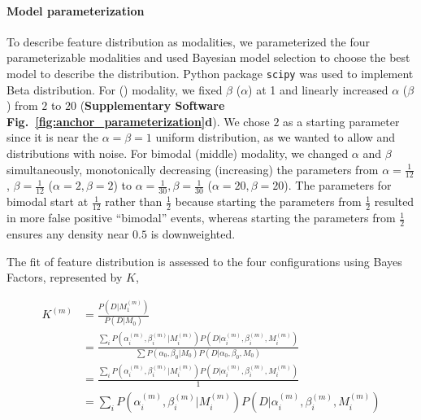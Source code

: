 \paragraph{Model parameterization}
To describe feature distribution as modalities, we parameterized the four parameterizable modalities and used Bayesian model selection to choose the best model to describe the distribution. Python package \texttt{scipy}\cite{Oliphant:2007dm,Millman:2011jv} was used to implement Beta distribution.
For \1 (\0) modality, we fixed $\beta$ ($\alpha$) at 1 and linearly increased $\alpha$ ($\beta$) from $2$ to $20$ (\textbf{Supplementary Software Fig.~\ref{fig:anchor_parameterization}d}). We chose $2$ as a starting parameter since it is near the $\alpha=\beta=1$ uniform distribution, as we wanted to allow \0 and \1 distributions with noise. For bimodal (middle) modality, we changed $\alpha$ and $\beta$ simultaneously, monotonically decreasing (increasing) the parameters from $\alpha=\frac{1}{12}$, $\beta = \frac{1}{12}$ ($\alpha = 2, \beta = 2$) to $\alpha = \frac{1}{30}, \beta = \frac{1}{30}$ ($\alpha = 20, \beta=20$). The parameters for bimodal start at $\frac{1}{12}$ rather than $\frac{1}{2}$ because starting the parameters from $\frac{1}{2}$ resulted in more false positive ``bimodal'' events, whereas starting the parameters from $\frac{1}{2}$ ensures any density near $0.5$ is downweighted.


The fit of feature distribution is assessed to the four configurations using Bayes Factors, represented by $K$,

\begin{align}
K^{(m)} 
&= \frac{P(D | M_1^{(m)})}{P(D | M_0)}\\
&= 
\frac{\sum_{i} P(\alpha_i^{(m)}, \beta_i^{(m)} | M_i^{(m)}) P(D | \alpha_i^{(m)}, \beta_i^{(m)}, M_i^{(m)})}
{\sum P(\alpha_0, \beta_0 | M_0) P(D | \alpha_0, \beta_0, M_0)}\\
&= 
\frac{\sum_{i} P(\alpha_i^{(m)}, \beta_i^{(m)} | M_i^{(m)}) P(D | \alpha_i^{(m)}, \beta_i^{(m)}, M_i^{(m)})}
{1}\\
&= 
\sum_{i} P(\alpha_i^{(m)}, \beta_i^{(m)} | M_i^{(m)}) P(D | \alpha_i^{(m)}, \beta_i^{(m)}, M_i^{(m)})
\end{align}

